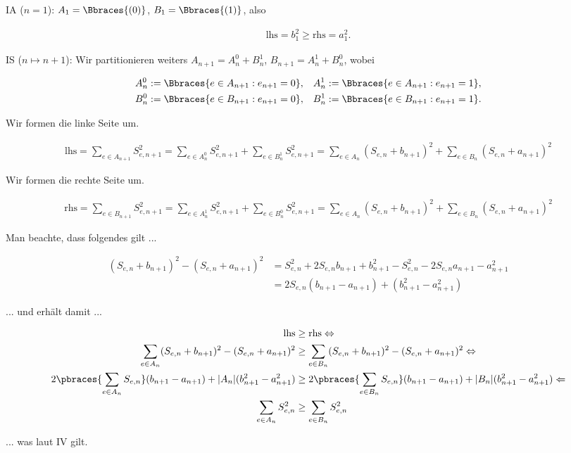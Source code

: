 \begin{solution}
IA ($n = 1$): $A_1 = \Bbraces{(0)}$, $B_1 = \Bbraces{(1)}$, also

\begin{align*}
  \text{lhs} = b_1^2 \geq \text{rhs} = a_1^2.
\end{align*}

IS ($n \mapsto n+1$): Wir partitionieren weiters $A_{n+1} = A_n^0 + B_n^1$, $B_{n+1} = A_n^1 + B_n^0$, wobei

\begin{align*}
  A_n^0 & := \Bbraces{e \in A_{n+1}: e_{n+1} = 0}, &
  A_n^1 & := \Bbraces{e \in A_{n+1}: e_{n+1} = 1}, \\
  B_n^0 & := \Bbraces{e \in B_{n+1}: e_{n+1} = 0}, &
  B_n^1 & := \Bbraces{e \in B_{n+1}: e_{n+1} = 1}.
\end{align*}

Wir formen die linke Seite um.

\begin{align*}
  \text{lhs}
  =
  \sum_{e \in A_{n+1}} S_{e, n+1}^2
  =
  \sum_{e \in A_n^0} S_{e, n+1}^2 +
  \sum_{e \in B_n^1} S_{e, n+1}^2
  =
  \sum_{e \in A_n} (S_{e, n} + b_{n+1})^2 +
  \sum_{e \in B_n} (S_{e, n} + a_{n+1})^2
\end{align*}

Wir formen die rechte Seite um.

\begin{align*}
  \text{rhs}
  =
  \sum_{e \in B_{n+1}} S_{e, n+1}^2
  =
  \sum_{e \in A_n^1} S_{e, n+1}^2 +
  \sum_{e \in B_n^0} S_{e, n+1}^2
  =
  \sum_{e \in A_n} (S_{e, n} + b_{n+1})^2 +
  \sum_{e \in B_n} (S_{e, n} + a_{n+1})^2
\end{align*}

Man beachte, dass folgendes gilt ...

\begin{align*}
  (S_{e, n} + b_{n+1})^2 - (S_{e, n} + a_{n+1})^2
  & =
  S_{e, n}^2 + 2 S_{e, n} b_{n+1} + b_{n+1}^2 -
  S_{e, n}^2 - 2 S_{e, n} a_{n+1} - a_{n+1}^2 \\
  & =
  2 S_{e, n} (b_{n+1} - a_{n+1}) + (b_{n+1}^2 - a_{n+1}^2)
\end{align*}

... und erhält damit ...

\begin{align*}
  \text{lhs}
  & \geq
  \text{rhs}
  \Leftrightarrow \\
  \sum_{e \in A_n} (S_{e, n} + b_{n+1})^2 - (S_{e, n} + a_{n+1})^2
  & \geq
  \sum_{e \in B_n} (S_{e, n} + b_{n+1})^2 - (S_{e, n} + a_{n+1})^2
  \Leftrightarrow \\
  2 \pbraces{\sum_{e \in A_n} S_{e, n}}(b_{n+1} - a_{n+1}) + |A_n| (b_{n+1}^2 - a_{n+1}^2)
  & \geq
  2 \pbraces{\sum_{e \in B_n} S_{e, n}}(b_{n+1} - a_{n+1}) + |B_n| (b_{n+1}^2 - a_{n+1}^2)
  \Leftarrow \\
  \sum_{e \in A_n} S_{e, n}^2
  & \geq
  \sum_{e \in B_n} S_{e, n}^2
\end{align*}

... was laut IV gilt.

\end{solution}

